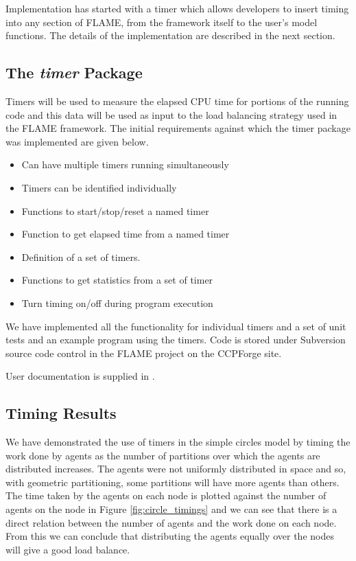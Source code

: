 Implementation has started with a timer which allows developers to insert timing into any section of FLAME, from the framework itself to the user's model functions. The details of the implementation are described in the next section.

\subsection{The \textit{timer} Package}

Timers will be used to measure the elapsed CPU time for portions of the running code and this data will be used as input to the load balancing strategy used in the FLAME framework. The initial requirements against which the timer package was implemented are given below.

\begin{itemize}
\item Can have multiple timers running simultaneously
\item Timers can be identified individually
\item Functions to start/stop/reset a named timer
\item Function to get elapsed time from a named timer
\item Definition of a set of timers.
\item Functions to get statistics from a set of timer
\item Turn timing on/off during program execution 
\end{itemize}

We have implemented all the functionality for individual timers and a set of unit tests and an example program using the timers. Code is stored under Subversion source code control in the FLAME project on the CCPForge site. 

User documentation is supplied in \cite{TimerAPI}.

\subsection{Timing Results}

We have demonstrated the use of timers in the simple circles model by timing the work done by agents as the number of partitions over which the agents are distributed increases. The agents were not uniformly distributed in space and so, with geometric partitioning, some partitions will have more agents than others. The time taken by the agents on each node is plotted against the number of agents on the node in Figure \ref{fig:circle_timings} and we can see that there is a direct relation between the number of agents and the work done on each node. From this we can conclude that distributing the agents equally over the nodes will give a good load balance.


